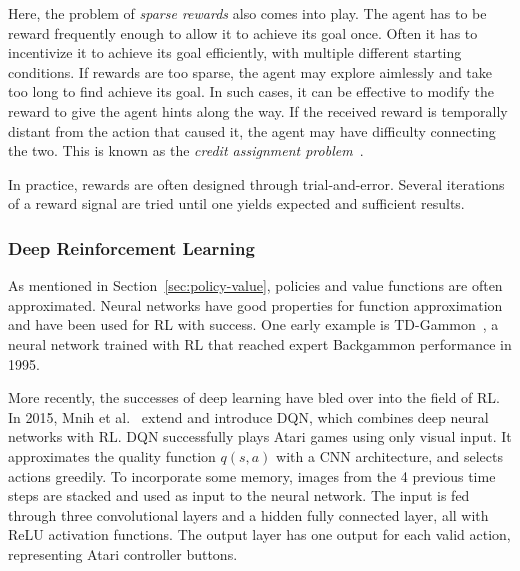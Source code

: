 Here, the problem of \textit{sparse rewards} also comes into play.
The agent has to be reward frequently enough to allow it to achieve its goal once.
Often it has to incentivize it to achieve its goal efficiently, with multiple different starting conditions.
If rewards are too sparse, the agent may explore aimlessly and take too long to find achieve its goal.
In such cases, it can be effective to modify the reward to give the agent hints along the way.
If the received reward is temporally distant from the action that caused it, the agent may have difficulty connecting the two.
This is known as the \textit{credit assignment problem}~\cite{minsky_cap_1961}.

In practice, rewards are often designed through trial-and-error.
Several iterations of a reward signal are tried until one yields expected and sufficient results.



\subsubsection{Deep Reinforcement Learning}

As mentioned in Section~\ref{sec:policy-value}, policies and value functions are often approximated.
Neural networks have good properties for function approximation and have been used for RL with success.
One early example is TD-Gammon~\cite{tesauro1995tdgammon}, a neural network trained with RL that reached expert Backgammon performance in 1995.

More recently, the successes of deep learning have bled over into the field of RL.
In 2015, Mnih et al.~\cite{mnih_human_2015} extend \cite{mnih_atari_2013} and introduce DQN, which combines deep neural networks with RL.
DQN successfully plays Atari games using only visual input.
It approximates the quality function \(q(s, a)\) with a CNN architecture, and selects actions greedily.
To incorporate some memory, images from the 4 previous time steps are stacked and used as input to the neural network.
The input is fed through three convolutional layers and a hidden fully connected layer, all with ReLU activation functions.
The output layer has one output for each valid action, representing Atari controller buttons.

